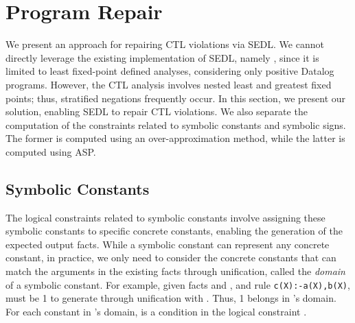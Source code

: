 \section{Program Repair}
\label{sec:program_repair}



We present an approach for repairing CTL violations via SEDL. 
We cannot directly leverage the existing implementation of SEDL, namely \Symlog, since it is limited to least fixed-point defined analyses, considering only positive Datalog programs. 
However, the CTL analysis involves nested least and greatest fixed points; thus, stratified negations frequently occur. 
In this section, we present our solution, enabling SEDL to repair CTL violations.
We also separate the computation of the constraints related to symbolic constants and symbolic signs.
The former is computed using an over-approximation method, while the latter is computed using ASP. 

\subsection{Symbolic Constants\label{sec:sym_const}}


The logical constraints related to symbolic constants involve assigning these symbolic constants to specific concrete constants, enabling the generation of the expected output facts. 
While a symbolic constant can represent any concrete constant, in practice, we only need to consider the concrete constants that can match the arguments in the existing facts through unification, called the \emph{domain} of a symbolic constant. 
For example, given facts  and , and rule \lstinline{c(X):-a(X),b(X)}, \code{\alpha} must be 1 to generate  through unification with . 
Thus, 1 belongs in \code{\alpha}'s domain. 
For each constant  in \code{\alpha}'s domain,  is a condition in the logical constraint \code{\psi}. 


